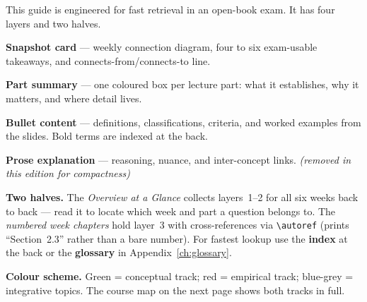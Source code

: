 \documentclass[../main.tex]{subfiles}
\begin{document}
\label{ch:howto}
\vspace{6pt}

This guide is engineered for fast retrieval in an open-book exam. It has four layers and two halves.

\begin{description}[topsep=2pt,itemsep=2pt,parsep=0pt,leftmargin=2cm,labelwidth=1.8cm,font=\bfseries]
  \item[Layer 1] \textbf{Snapshot card} — weekly connection diagram, four to six exam-usable takeaways, and connects-from/connects-to line.
  \item[Layer 2] \textbf{Part summary} — one coloured box per lecture part: what it establishes, why it matters, and where detail lives.
  \item[Layer 3] \textbf{Bullet content} — definitions, classifications, criteria, and worked examples from the slides. Bold terms are indexed at the back.
  \item[Layer 4] \textbf{Prose explanation} — reasoning, nuance, and inter-concept links. \emph{(removed in this edition for compactness)}
\end{description}

\vspace{4pt}
\textbf{Two halves.} The \emph{Overview at a Glance} collects layers~1--2 for all six weeks back to back — read it to locate which week and part a question belongs to. The \emph{numbered week chapters} hold layer~3 with cross-references via \verb|\autoref| (prints ``Section~2.3'' rather than a bare number). For fastest lookup use the \textbf{index} at the back or the \textbf{glossary} in Appendix~\ref{ch:glossary}.

\textbf{Colour scheme.} Green = conceptual track; red = empirical track; blue-grey = integrative topics. The course map on the next page shows both tracks in full.

\bigskip
\end{document}
